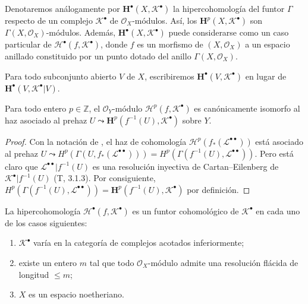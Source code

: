\begin{env}[12.4.2]
\label{0.12.4.2}
\label{0.12.4.2-fr}
Denotaremos análogamente por $\mathbf H^\bullet(X,\mathcal K^\bullet)$ la
hipercohomología del funtor $\Gamma$ respecto de un complejo
$\mathcal K^\bullet$ de $\mathcal O_X$-módulos.
Así, los $\mathbf H^p(X,\mathcal K^\bullet)$ son
$\Gamma(X,\mathcal O_X)$-módulos.
Además, $\mathbf H^\bullet(X,\mathcal K^\bullet)$ puede considerarse como un
caso particular de $\mathscr H^\bullet(f,\mathcal K^\bullet)$, donde $f$ es un
morfismo de $(X,\mathcal O_X)$ a un espacio anillado constituido por un punto
dotado del anillo $\Gamma(X,\mathcal O_X)$.

Para todo subconjunto abierto $V$ de $X$, escribiremos
$\mathbf H^\bullet(V,\mathcal K^\bullet)$ en lugar de
$\mathbf H^\bullet(V,\mathcal K^\bullet|V)$.
\end{env}

\begin{proposition}[12.4.3]
\label{0.12.4.3}
\label{0.12.4.3-fr}
Para todo entero $p\in\mathbb Z$, el $\mathcal O_Y$-módulo
$\mathscr H^p(f,\mathcal K^\bullet)$ es canónicamente isomorfo al haz
asociado al prehaz
$U\leadsto\mathbf H^p(f^{-1}(U),\mathcal K^\bullet)$
sobre $Y$.
\end{proposition}

\begin{proof}
Con la notación de , el haz de cohomología
$\mathcal H^p(f_*(\mathcal L^{\bullet\bullet}))$ está asociado al
prehaz
$U\leadsto H^p(\Gamma(U,f_*(\mathcal L^{\bullet\bullet})))=H^p(\Gamma(f^{-1}(U),\mathcal L^{\bullet\bullet}))$.
Pero está claro que
$\mathcal L^{\bullet\bullet}|f^{-1}(U)$ es una resolución inyectiva de
Cartan--Eilenberg de $\mathcal K^\bullet|f^{-1}(U)$ (T, 3.1.3).
Por consiguiente,
$H^p(\Gamma(f^{-1}(U),\mathcal L^{\bullet\bullet}))=\mathbf H^p(f^{-1}(U),\mathcal K^\bullet)$
por definición.
\end{proof}

\begin{proposition}[12.4.4]
\label{0.12.4.4}
\label{0.12.4.4-fr}
La hipercohomología $\mathscr H^\bullet(f,\mathcal K^\bullet)$ es un
funtor cohomológico de $\mathcal K^\bullet$ en cada uno de los casos
siguientes:
\begin{enumerate}
  \item[\rm{a)}] $\mathcal K^\bullet$ varía en la categoría de complejos
    acotados inferiormente;
  \item[\rm{b)}] existe un entero $m$ tal que todo
    $\mathcal O_X$-módulo admite una resolución flácida de longitud $\leq m$;
  \item[\rm{c)}] $X$ es un espacio noetheriano.
\end{enumerate}
\end{proposition}

